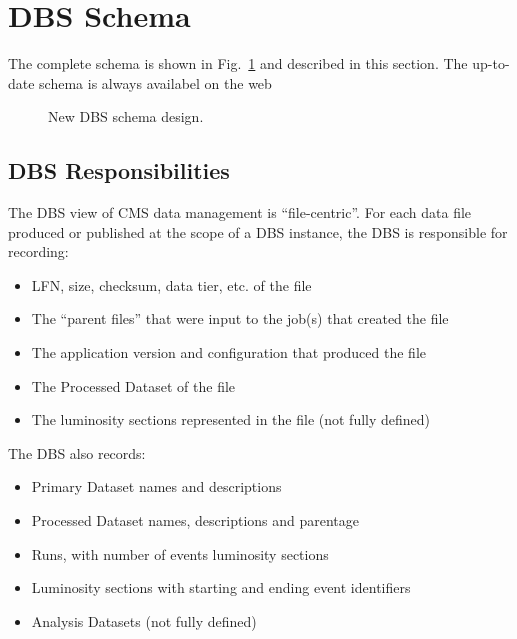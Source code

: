 \documentclass{cmspaper}
\begin{document}
\section{DBS Schema}

The complete schema is shown in  Fig.~\ref{fig:new-dbs-schema-design} and described in this section. The up-to-date schema is always availabel on the web~\cite{dbs-schema}
\begin{figure}[hbtp]
  \begin{center}
    \caption{New DBS schema design.}
    \label{fig:new-dbs-schema-design}
  \end{center}
\end{figure} 
\subsection{DBS Responsibilities}



The DBS view of CMS data management is ``file-centric''.
For each data file produced or published at the scope of a DBS instance,
the DBS is responsible for recording:

\begin{itemize}
\item LFN, size, checksum, data tier, etc. of the file
\item The ``parent files'' that were input to the job(s)
that created the file
\item The application version and configuration that produced
the file
\item The Processed Dataset of the file
\item The luminosity sections represented in the file (not fully
defined)
\end{itemize}

The DBS also records:

\begin{itemize}
\item Primary Dataset names and descriptions
\item Processed Dataset names, descriptions and parentage
\item Runs, with number of events luminosity sections
\item Luminosity sections with starting and ending event identifiers
\item Analysis Datasets (not fully defined)
\end{itemize}
\end{document}
